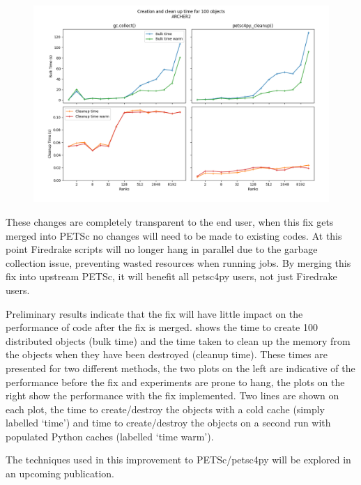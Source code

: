 \documentclass[a4paper,11pt]{article}
\begin{document}
\begin{figure}[htb]
	\centering
	\includegraphics[width=\textwidth]{D100BS128B_222.png}
	\vspace{-1em}
	\caption{}
	\label{fig:perf_comp}
\end{figure}

These changes are completely transparent to the end user, when this fix gets merged into PETSc no changes will need to be made to existing codes.
At this point Firedrake scripts will no longer hang in parallel due to the garbage collection issue, preventing wasted resources when running jobs.
By merging this fix into upstream PETSc, it will benefit all petsc4py users, not just Firedrake users.

Preliminary results indicate that the fix will have little impact on the performance of code after the fix is merged.
 shows the time to create 100 distributed objects (bulk time) and the time taken to clean up the memory from the objects when they have been destroyed (cleanup time).
These times are presented for two different methods, the two plots on the left are indicative of the performance before the fix and experiments are prone to hang, the plots on the right show the performance with the fix implemented.
Two lines are shown on each plot, the time to create/destroy the objects with a cold cache (simply labelled `time') and time to create/destroy the objects on a second run with populated Python caches (labelled `time warm').

The techniques used in this improvement to PETSc/petsc4py will be explored in an upcoming publication.
\end{document}

